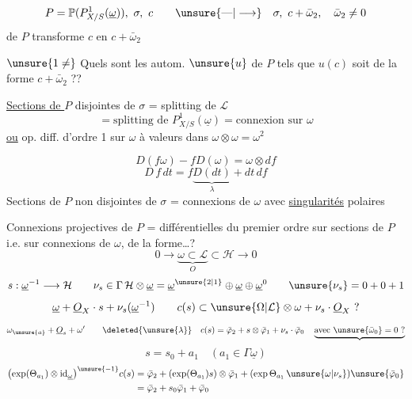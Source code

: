 \[
P=\mathbb P(P^1_{X/S}(\underline\omega)),\ \sigma,\ c
\qquad\unsure{\text{---}|\longrightarrow}\quad\sigma,\ c+\bar\omega_2,\quad\bar\omega_2\ne0
\]
 de $P$ transforme $c$ en $c+\bar\omega_2$

 \uline{} $\unsure{1\ne}$ 
Quels sont les autom. $\unsure{u}$ de $P$ tels que $u(c)$ soit de la forme $c+\bar\omega_2$ ??

\margin{$\unsure{\omega}$}

\uline{Sections de $P$} disjointes de $\sigma$ = splitting de $\mathcal L$
\[
=\text{splitting de }P^1_{X/S}(\underline\omega)
=\text{connexion sur }\omega
\]
\uline{ou} op. diff. d'ordre 1 sur $\omega$ à valeurs dans $\omega\otimes\omega=\omega^2$

\[
D(f\omega)-fD(\omega)=\omega\otimes df
\]
\[
D\,f\,dt=f\underbrace{D(dt)}_{\lambda}+dt\,df
\]
Sections de $P$ non disjointes de $\sigma$ = connexions de $\omega$ avec  \uline{singularités} polaires

Connexions projectives de $P$ =  différentielles du premier ordre sur sections de $P$ i.e. sur connexions de $\omega$, de la forme\ldots ?
\[
0\longrightarrow\underbrace{\omega\subset\mathcal L}_{O}\subset\mathcal H\longrightarrow0
\]
\[
s:\underline\omega^{-1}\longrightarrow\mathcal H
\qquad
\nu_s\in\Gamma\,\mathcal H\otimes\underline\omega
=\underline\omega^{\unsure{2|1}}\oplus\underline\omega\oplus\underline\omega^0
\qquad\unsure{\nu_s}=0+0+1
\]
\[
\underline\omega+\underline O_X\cdot s+\nu_s(\underline\omega^{-1})
\qquad c(s)\subset\unsure{\Omega|\mathcal L}\otimes\omega+\nu_s\cdot\underline O_X\ ?
\]
\[
\omega_{\unsure{a}}+\underline O_s+\omega'
\qquad \deleted{\unsure{\lambda}}\quad
c(s)=\bar\varphi_2+s\otimes\bar\varphi_1+\nu_s\cdot\bar\varphi_0
\quad\underbrace{\text{avec }\unsure{\bar\omega_0}=0\ ?}
\]
\[
s=s_0+a_1\quad(a_1\in\Gamma\underline\omega)
\]
\[
\begin{aligned}
\bigl(\exp(\Theta_{a_1})\otimes\mathrm{id}_{\underline\omega}\bigr)^{\unsure{-1}}c(s)
&=\bar\varphi_2+(\exp(\Theta_{a_1})s)\otimes\bar\varphi_1
 +(\exp\Theta_{a_1}\,\unsure{\omega|\nu_s})\unsure{\bar\varphi_0}\\
&=\bar\varphi_2+s_0\bar\varphi_1+\bar\varphi_0
\end{aligned}
\]

